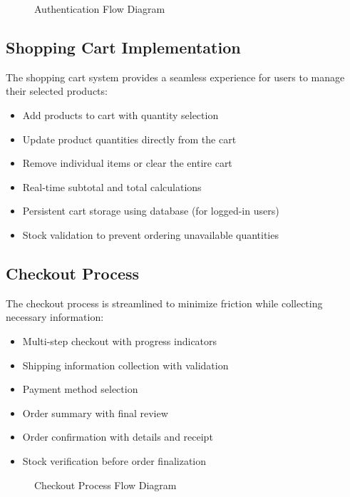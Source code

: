 \documentclass[14pt,a4paper]{article}
\begin{document}
\begin{figure}[H]
	\centering
	\caption{Authentication Flow Diagram}
	\label{fig:auth-flow}
\end{figure}

\subsection{Shopping Cart Implementation}

The shopping cart system provides a seamless experience for users to manage their selected products:

\begin{itemize}
	\item Add products to cart with quantity selection
	\item Update product quantities directly from the cart
	\item Remove individual items or clear the entire cart
	\item Real-time subtotal and total calculations
	\item Persistent cart storage using database (for logged-in users)
	\item Stock validation to prevent ordering unavailable quantities
\end{itemize}

\subsection{Checkout Process}

The checkout process is streamlined to minimize friction while collecting necessary information:

\begin{itemize}
	\item Multi-step checkout with progress indicators
	\item Shipping information collection with validation
	\item Payment method selection
	\item Order summary with final review
	\item Order confirmation with details and receipt
	\item Stock verification before order finalization
\end{itemize}

\begin{figure}[H]
	\centering
	\caption{Checkout Process Flow Diagram}
	\label{fig:checkout-flow}
\end{figure}
\end{document}
